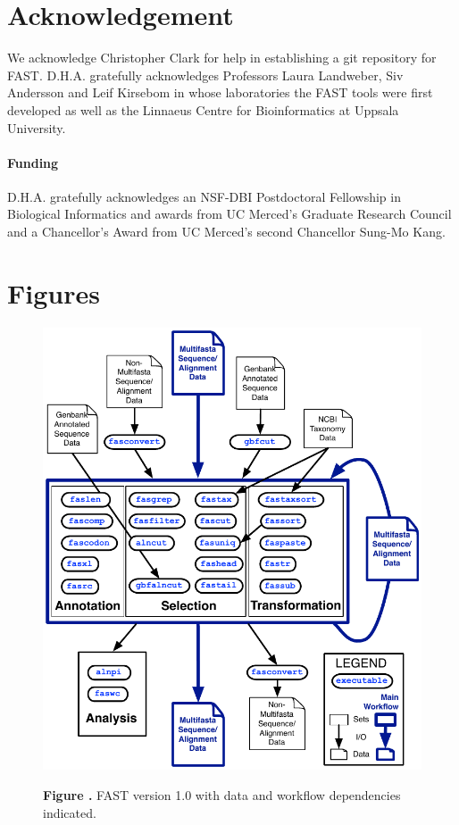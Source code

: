 \documentclass{frontiersSCNS} %
\begin{document}
\section*{Acknowledgement}
We acknowledge Christopher Clark for help in establishing a git
repository for FAST. D.H.A. gratefully acknowledges Professors Laura
Landweber, Siv Andersson and Leif Kirsebom in whose laboratories the
FAST tools were first developed as well as the Linnaeus Centre for
Bioinformatics at Uppsala University.

\paragraph{Funding\textcolon} D.H.A. gratefully acknowledges an
NSF-DBI Postdoctoral Fellowship in Biological Informatics and awards
from UC Merced's Graduate Research Council and a Chancellor's Award
from UC Merced's second Chancellor Sung-Mo Kang.



\section*{Figures}

\begin{figure}
\begin{center}
\includegraphics[width=4.5in]{FAST_v8}%
\end{center}
 \textbf{\label{fig:01} Figure
   .}{ FAST version 1.0 with data and workflow
   dependencies indicated.}
\end{figure}
\end{document}

